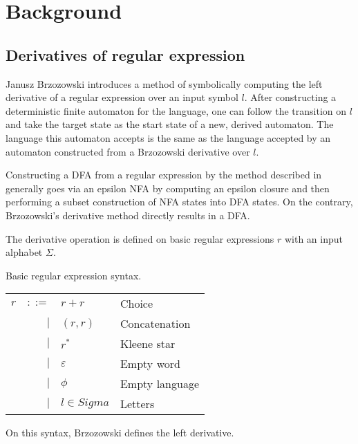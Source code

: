 \chapter{Background}
\label{background}

\section{Derivatives of regular expression}

Janusz Brzozowski introduces a method of symbolically computing the left
derivative of a regular expression over an input symbol $l$. After constructing
a deterministic finite automaton for the language, one can follow the transition
on $l$ and take the target state as the start state of a new, derived automaton.
The language this automaton accepts is the same as the language accepted by an
automaton constructed from a Brzozowski derivative over $l$.

Constructing a DFA from a regular expression by the method described in
\cite{thompson} generally goes via an epsilon NFA by computing an epsilon
closure and then performing a subset construction of NFA states into DFA states.
On the contrary, Brzozowski's derivative method directly results in a DFA.

The derivative operation is defined on basic regular expressions $r$ with an
input alphabet $\Sigma$.

\begin{defn}
   \label{defn-bre}
   Basic regular expression syntax.

   \begin{tabular}{lrll}
      $r$	& $::=$	& $r+r$				& Choice		\\
		& $|$	& $(r,r)$			& Concatenation		\\
		& $|$	& $r^*$				& Kleene star		\\
		& $|$	& $\varepsilon$			& Empty word		\\
		& $|$	& $\phi$			& Empty language	\\
		& $|$	& $l \in Sigma$			& Letters		\\
   \end{tabular}
\end{defn}

On this syntax, Brzozowski defines the left derivative.

